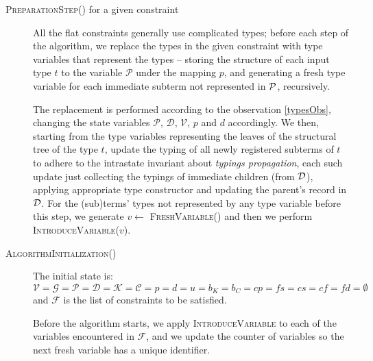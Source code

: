 \begin{description}
    \item[\textsc{PreparationStep()} for a given constraint] All the flat constraints generally use complicated types; before each step of the algorithm, we replace the types in the given constraint with type variables that represent the types --  storing the structure of each input type $t$ to the variable $\mathcal P$ under the mapping $p$, and generating a fresh type variable for each immediate subterm not represented in $\mathcal P$, recursively.

    The replacement is performed according to the observation \ref{typesObs}, changing the state variables $\mathcal{P}$, $\mathcal{D}$, $\mathcal{V}$, $p$ and $d$ accordingly. We then, starting from the type variables representing the leaves of the structural tree of the type $t$, update the typing of all newly registered subterms of $t$ to adhere to the intrastate invariant about \emph{typings propagation}, each such update just collecting the typings of immediate children (from $\mathcal D$), applying appropriate type constructor and updating the parent's record in $\mathcal D$. For the (sub)terms' types not represented by any type variable before this step, we generate $v \gets $ \textsc{FreshVariable()} and then we perform \textsc{IntroduceVariable($v$)}.

    \item[\textsc{AlgorithmInitialization()}] The initial state is: $\mathcal{V} = \mathcal{G} = \mathcal{P} = \mathcal{D} = \mathcal{K} = \mathcal{C} = p = d = u = b_K = b_C = cp = fs = cs = cf = fd = \emptyset$ and $\mathcal{F}$ is the list of constraints to be satisfied.

    Before the algorithm starts, we apply \textsc{IntroduceVariable} to each of the variables encountered in $\mathcal{F}$, and we update the counter of variables so the next fresh variable has a unique identifier.
\end{description}

